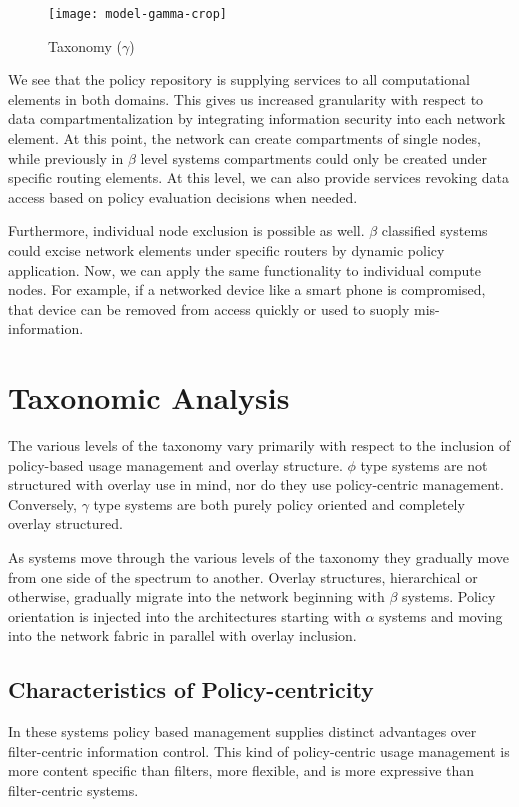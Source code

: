 \begin{figure}[!t]
\centering
\texttt{[image: model-gamma-crop]}
\caption{Taxonomy ($\gamma$)}
\label{fig:model:taxonomy-gamma}
\end{figure}

We see that the policy repository is supplying services to all computational elements in both domains.  This gives us increased granularity with respect to data compartmentalization by integrating information security into each network element.  At this point, the network can create compartments of single nodes, while previously in $\beta$ level systems compartments could only be created under specific routing elements.  At this level, we can also provide services revoking data access based on policy evaluation decisions when needed.

Furthermore, individual node exclusion is possible as well. $\beta$ classified systems could excise network elements under specific routers by dynamic policy application.  Now, we can apply the same functionality to individual compute nodes.  For example, if a networked device like a smart phone is compromised, that device can be removed from access quickly or used to suoply mis-information.

\section{Taxonomic Analysis}
The various levels of the taxonomy vary primarily with respect to the inclusion of policy-based usage management and overlay structure.  $\phi$ type systems are not structured with overlay use in mind, nor do they use policy-centric management.  Conversely, $\gamma$ type systems are both purely policy oriented and completely overlay structured.

As systems move through the various levels of the taxonomy they gradually move from one side of the spectrum to another.  Overlay structures, hierarchical or otherwise, gradually migrate into the network beginning with $\beta$ systems.  Policy orientation is injected into the architectures starting with $\alpha$ systems and moving into the network fabric in parallel with overlay inclusion.

\subsection{Characteristics of Policy-centricity}
In these systems policy based management supplies distinct advantages over filter-centric information control.  This kind of policy-centric usage management is more content specific than filters, more flexible, and is more expressive than filter-centric systems.

